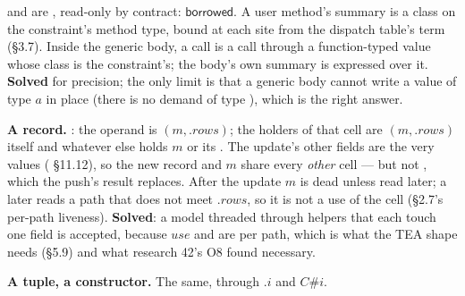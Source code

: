 
 and  are , read-only by contract: $\mathsf{borrowed}$. A user method's summary is a class on the constraint's method type, bound at each site from the dispatch table's term (§3.7). Inside the generic body, a call  is a call through a function-typed value whose class is the constraint's; the body's own summary is expressed over it. \textbf{Solved} for precision; the only limit is that a generic body cannot write a value of type $a$ in place (there is no demand of type ), which is the right answer.


\textbf{A record.} : the operand is $(m,\allowbreak{}.\mathit{rows})$; the holders of that cell are $(m,\allowbreak{}.\mathit{rows})$ itself and whatever else holds $m$ or its . The update's other fields are the very values ( §11.12), so the new record and $m$ share every \emph{other} cell — but not , which the push's result replaces. After the update $m$ is dead unless read later; a later  reads a path that does not meet $.\mathit{rows}$, so it is not a use of the cell (§2.7's per-path liveness). \textbf{Solved}: a model threaded through helpers that each touch one field is accepted, because $\mathit{use}$ and  are per path, which is what the TEA shape needs (§5.9) and what research 42's O8 found necessary.

\textbf{A tuple, a constructor.} The same, through $.i$ and $C\#i$.

